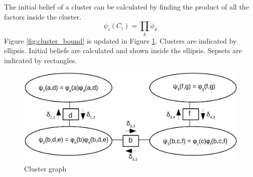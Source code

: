 \documentclass[12pt,oneside,openany,a4paper, %
afrikaans,english,
]{memoir}
\numberwithin{equation}{chapter}
\begin{document}
The initial belief of a cluster can be calculated by finding the product of all the factors inside the cluster.~\citep{koller}
\begin{equation}
\psi_i(C_i) = \prod_{k}\phi_k
\end{equation}
Figure \ref{fig:cluster_bound} is updated in Figure \ref{fig:clustergraph}. Clusters are indicated by ellipsis. Initial beliefs are calculated and shown inside the ellipsis. Sepsets are indicated by rectangles.\\
\begin{figure}[H]
  \includegraphics[width=\linewidth]{Figures/clustergraph.png}
  \centering
  \caption{Cluster graph}
  \label{fig:clustergraph}
\end{figure}
\end{document}
